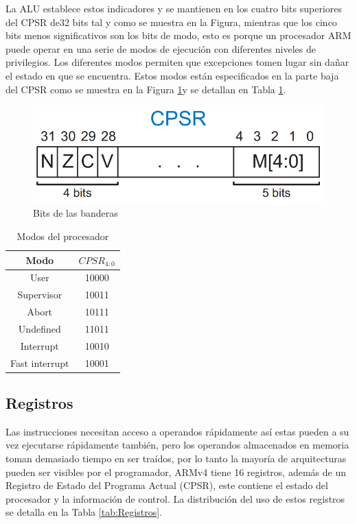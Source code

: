 \documentclass[journal,trans]{IEEEtran}
\begin{document}
	La ALU establece estos indicadores y se mantienen en los cuatro bits superiores del CPSR de32 bits tal y como se muestra en la Figura, mientras que los cinco bits menos significativos son los bits de modo, esto es porque un procesador ARM puede operar en una serie de modos de ejecución con diferentes niveles de privilegios. Los diferentes modos permiten que excepciones tomen lugar sin dañar el estado en que se encuentra. Estos modos están especificados en la parte baja del CPSR como se muestra en la Figura \ref{fig:Banderas}y se detallan en Tabla \ref{tab:Modos}.
	
	\begin{figure}[htbp]
		\centering
		\includegraphics[width =\linewidth]{img/CPSR.png}
		\caption{Bits de las banderas \cite{SarahLHarris2010}}
		\label{fig:Banderas}
	\end{figure}
	
	\begin{table}[htbp]
		\centering
		\begin{tabular}{|c|c|}
			\hline
			Modo           &  $CPSR_{4:0}$ \\
			\hline
			\hline
			User           &  10000 \\
			\hline
			Supervisor     &  10011 \\
			\hline
			Abort          &  10111 \\
			\hline
			Undefined      &  11011 \\
			\hline
			Interrupt      &  10010 \\
			\hline
			Fast interrupt &  10001 \\
			\hline
		\end{tabular}
		\caption{Modos del procesador}
		\label{tab:Modos}
	\end{table}
		
	\subsection{Registros}
	Las instrucciones necesitan acceso a operandos rápidamente así estas pueden a su vez ejecutarse rápidamente también, pero los operandos almacenados en memoria toman demasiado tiempo en ser traídos, por lo tanto la mayoría de arquitecturas pueden ser visibles por el programador, ARMv4 tiene 16 registros, además de un Registro de Estado del Programa Actual (CPSR), este contiene el estado del procesador y la información de control.
	La distribución del uso de estos registros se detalla en la Tabla \ref{tab:Registros}.
	
\end{document}
